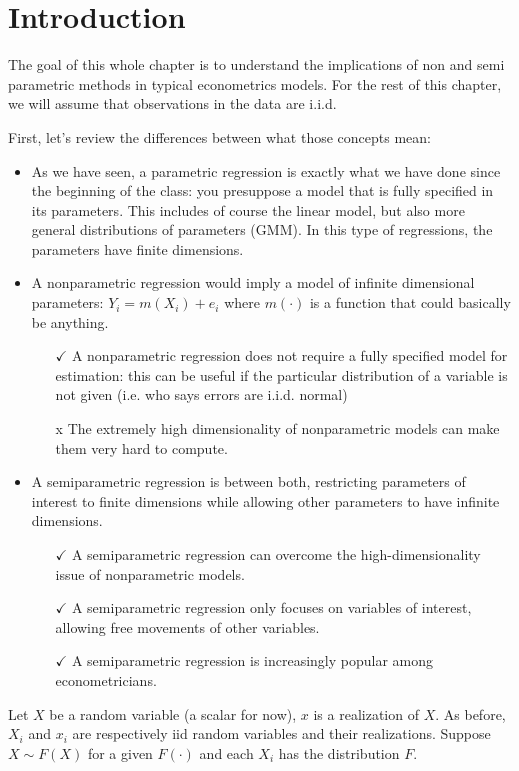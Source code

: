 \section{Introduction}

The goal of this whole chapter is to understand the implications of non and semi parametric methods in typical econometrics models. For the rest of this chapter, we will assume that observations in the data are i.i.d.

First, let's review the differences between what those concepts mean:\begin{itemize}
\item As we have seen, a parametric regression is exactly what we have done since the beginning of the class: you presuppose a model that is fully specified in its parameters. This includes of course the linear model, but also more general distributions of parameters (GMM). In this type of regressions, the parameters have finite dimensions.
\item A nonparametric regression would imply a model of infinite dimensional parameters: $Y_i = m(X_i) + e_i$ where $m(\cdot)$ is a function that could basically be anything.\begin{itemize}
\item[$\checkmark$] A nonparametric regression does not require a fully specified model for estimation: this can be useful if the particular distribution of a variable is not given (i.e. who says errors are i.i.d. normal)
\item[x] The extremely high dimensionality of nonparametric models can make them very hard to compute.
\end{itemize}
\item A semiparametric regression is between both, restricting parameters of interest to finite dimensions while allowing other parameters to have infinite dimensions.\begin{itemize}
\item[$\checkmark$] A semiparametric regression can overcome the high-dimensionality issue of nonparametric models.
\item[$\checkmark$] A semiparametric regression only focuses on variables of interest, allowing free movements of other variables.
\item[$\checkmark$] A semiparametric regression is increasingly popular among econometricians.
\end{itemize}
\end{itemize}

Let $X$ be a random variable (a scalar for now), $x$ is a realization of $X$. As before, $X_i$ and $x_i$ are respectively iid random variables and their realizations. Suppose $X\sim F(X)$ for a given $F(\cdot)$ and each $X_i$ has the distribution $F$.

